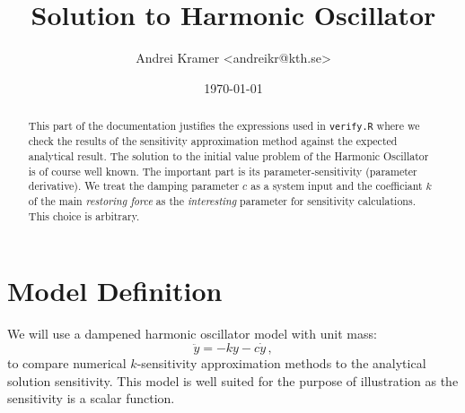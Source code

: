 \documentclass[utf8,english,DIV=12]{scrartcl}
\author{Andrei Kramer <andreikr@kth.se>}
\date{\today}
\title{Solution to Harmonic Oscillator}
\begin{document}
\maketitle
\begin{abstract}
  \noindent This part of the documentation justifies the expressions used in
  \texttt{verify.R} where we check the results of the sensitivity
  approximation method against the expected analytical result. The
  solution to the initial value problem of the Harmonic Oscillator is
  of course well known. The important part is its
  parameter-sensitivity (parameter derivative). We treat the damping
  parameter $c$ as a system input and the coefficiant $k$ of the main
  \emph{restoring force} as the \emph{interesting} parameter for sensitivity
  calculations. This choice is arbitrary.
\end{abstract}
\section{Model Definition}
\label{sec:model}

We will use a dampened harmonic oscillator model with unit mass: 
\begin{equation}
  \label{eq:ivp}
  \ddot y = -ky -c \dot y \,,
\end{equation}
to compare numerical $k$-sensitivity approximation methods to the
analytical solution sensitivity. This model is well suited for the
purpose of illustration as the sensitivity is a scalar function.
\end{document}
